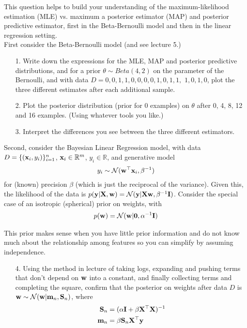 \documentclass[submit]{harvardml}
\begin{document}
\newpage
\begin{problem}

  This question helps to build your understanding of the
  maximum-likelihood estimation (MLE) vs. maximum a posterior estimator
  (MAP) and posterior predictive estimator, first in the
  Beta-Bernoulli model and then in the linear regression setting.\\

First consider the Beta-Bernoulli model (and see lecture 5.)
%
\begin{enumerate}
\item[1.] Write down the expressions for the MLE, MAP and posterior predictive
distributions, and for
a prior $\theta\sim Beta(4,2)$ on the
parameter of the Bernoulli,
and  with data $D= 0, 0, 1, 1, 0, 0, 0, 0, 1, 0, 1, 1,$
$1, 0, 1, 0$, plot
the three different
estimates after each additional
sample.
%
\item[2.] Plot the posterior distribution (prior for 0 examples) on $\theta$ after 0, 4, 8, 12 and 16
examples. (Using whatever tools you like.)
%
\item[3.] Interpret the differences you see between the three different
estimators.
%
%
\end{enumerate}

Second, consider the Bayesian Linear Regression model, with
data $D=\{(\mathbf{x}_i,y_i)\}_{i=1}^n$, $\mathbf{x}_i\in\mathbb{R}^m$,
 $y_i\in\mathbb{R}$, and generative model
%
$$
y_i\sim\mathcal{N}(\mathbf{w}^\top\mathbf{x}_i,\beta^{-1})
$$
for (known) precision $\beta$ (which is just the reciprocal
of the variance). Given this, the likelihood of the
data is $p(\mathbf{y}|\mathbf{X},\mathbf{w}) = \mathcal{N}(\mathbf{y}|\mathbf{X}\mathbf{w},\beta^{-1}\mathbf{I})$. Consider the special case of
an isotropic (spherical) prior on weights, with
%
$$
p(\mathbf{w})=\mathcal{N}(\mathbf{w}|\bold0,\alpha^{-1}\mathbf{I})
$$

This prior makes sense when you have little prior information and do not know much about the relationship among features so you can simplify by assuming independence.

\begin{enumerate}

\item[4.] Using the method in lecture of taking logs, expanding and pushing terms
that don't depend on $\mathbf{w}$ into a constant, and finally collecting
terms and completing the square, confirm that the posterior on
weights after data $D$ is $\mathbf{w}\sim\mathcal{N}(\mathbf{w}|\mathbf{m}_n,\mathbf{S}_n)$,
where
%
\begin{align*}
\mathbf{S}_n&=(\alpha\mathbf{I}+\beta\mathbf{X}^\top\mathbf{X})^{-1}\\
\mathbf{m}_n&=\beta\mathbf{S}_n\mathbf{X}^\top\mathbf{y}
\end{align*}
\end{enumerate}
\end{problem}
\end{document}
